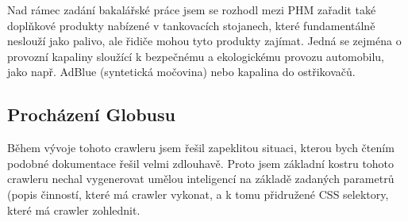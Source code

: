 Nad rámec zadání bakalářské práce jsem se rozhodl mezi PHM zařadit také
doplňkové produkty nabízené v tankovacích stojanech, které fundamentálně
neslouží jako palivo, ale řidiče mohou tyto produkty zajímat. Jedná se
zejména o provozní kapaliny sloužící k bezpečnému a ekologickému provozu
automobilu, jako např. AdBlue (syntetická močovina) nebo kapalina
do ostřikovačů.

\subsection{Procházení Globusu}
\label{sec:crawling-globus}

Během vývoje tohoto crawleru jsem řešil zapeklitou situaci, kterou bych
čtením podobné dokumentace řešil velmi zdlouhavě. Proto jsem základní
kostru tohoto crawleru nechal vygenerovat umělou inteligencí na základě
zadaných parametrů (popis činností, které má crawler vykonat, a k tomu
přidružené CSS selektory, které má crawler zohlednit.
\cite{shCgjU2g2YA0ff8T} %

